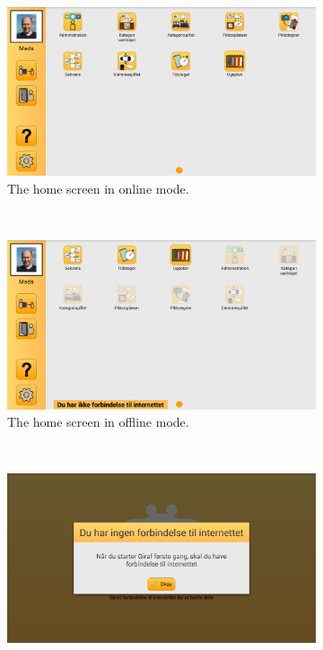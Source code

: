 \begin{figure}[h!]
    \centering
    \begin{subfigure}[t]{0.47\textwidth}
        \includegraphics[width=\textwidth]{figures/img/screenshots/reg_homescreen.png}
        \caption{The home screen in online mode.}\label{fig:online_homescreen}
    \end{subfigure}%
    ~
    \begin{subfigure}[t]{0.47\textwidth}
        \includegraphics[width=\textwidth]{figures/img/screenshots/offline_homescreen.png}
        \caption{The home screen in offline mode.}\label{fig:offline_homescreen}
    \end{subfigure}
    \\
    \begin{subfigure}[t]{0.47\textwidth}
        \includegraphics[width=\textwidth]{figures/img/screenshots/offline_initstart.png}

\end{subfigure}
\end{figure}
